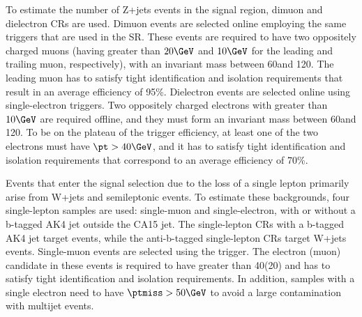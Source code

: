 To estimate the number of Z+jets events in the signal region, dimuon and dielectron CRs are used.
Dimuon events are selected online employing the same \MET triggers that are used in the SR.
These events are required to have two oppositely charged muons (having
\pt greater than $20\GeV$ and $10\GeV$ for the leading and trailing
muon, respectively), with an invariant mass between 60\GeV and 120\GeV.
The leading muon has to satisfy tight identification and isolation requirements that result in an average efficiency of 95\%.
Dielectron events are selected online using single-electron triggers. %
Two oppositely charged electrons with \pt greater than $10\GeV$ are required offline, and they must form an invariant mass between 60\GeV and 120\GeV.
To be on the plateau of the trigger efficiency, at least one of the two electrons must have $\pt>40\GeV$, and it has to satisfy tight identification and isolation requirements that correspond to an average efficiency of 70\%.

Events that enter the signal selection due to the loss of a single lepton primarily arise from W+jets and semileptonic \ttbar events.
To estimate these backgrounds, four single-lepton samples are used: single-muon and single-electron, with or without a b-tagged AK4 jet outside the CA15 jet.
The single-lepton CRs with a b-tagged AK4 jet target \ttbar events, while the anti-b-tagged single-lepton CRs target W+jets events.
Single-muon events are selected using the \MET trigger.
The electron (muon) candidate in these events is required to have \pt greater than 40\GeV (20\GeV) and has to satisfy tight identification and isolation requirements.
In addition, samples with a single electron need to have $\ptmiss>50\GeV$ to avoid a large contamination with multijet events.


